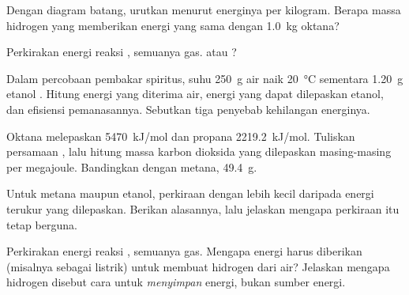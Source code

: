 \begin{exercise}[$\star\star$]\label{exo:g11:reaction-energy:10}
Dengan diagram batang, urutkan  menurut energinya per
kilogram. Berapa massa hidrogen yang memberikan energi yang sama dengan
\qty{1.0}{kg} oktana?
\end{exercise}

\begin{exercise}[$\star\star$]\label{exo:g11:reaction-energy:11}
Perkirakan energi reaksi , semuanya gas. 
atau ?
\end{exercise}

\begin{exercise}[$\star\star\star$]\label{exo:g11:reaction-energy:12}
Dalam percobaan pembakar spiritus, suhu \qty{250}{g} air naik
\qty{20}{\celsius} sementara \qty{1.20}{g} etanol . Hitung
energi yang diterima air, energi yang dapat dilepaskan etanol, dan
efisiensi pemanasannya. Sebutkan tiga penyebab kehilangan energinya.
\end{exercise}

\begin{exercise}[$\star\star\star$]\label{exo:g11:reaction-energy:13}
Oktana melepaskan \qty{5470}{kJ/mol} dan propana \qty{2219.2}{kJ/mol}.
Tuliskan persamaan , lalu hitung massa karbon dioksida
yang dilepaskan masing-masing per megajoule. Bandingkan dengan metana,
\qty{49.4}{g}.
\end{exercise}

\begin{exercise}[$\star\star\star$]\label{exo:g11:reaction-energy:14}
Untuk metana maupun etanol, perkiraan dengan  lebih kecil
daripada energi terukur yang dilepaskan. Berikan alasannya, lalu
jelaskan mengapa perkiraan itu tetap berguna.
\end{exercise}

\begin{exercise}[$\star\star\star$]\label{exo:g11:reaction-energy:15}
Perkirakan energi reaksi , semuanya gas. Mengapa
energi harus diberikan (misalnya sebagai listrik) untuk membuat hidrogen
dari air? Jelaskan mengapa hidrogen disebut cara untuk
\emph{menyimpan} energi, bukan sumber energi.
\end{exercise}

